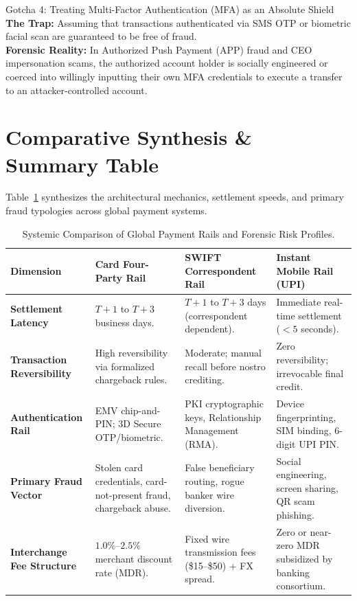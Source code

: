 \begin{trapbox}{Gotcha 4: Treating Multi-Factor Authentication (MFA) as an Absolute Shield}
\textbf{The Trap:} Assuming that transactions authenticated via SMS OTP or biometric facial scan are guaranteed to be free of fraud.\\
\textbf{Forensic Reality:} In Authorized Push Payment (APP) fraud and CEO impersonation scams, the authorized account holder is socially engineered or coerced into willingly inputting their own MFA credentials to execute a transfer to an attacker-controlled account.
\end{trapbox}

\section{Comparative Synthesis \& Summary Table}

Table~\ref{tab:comparison_payment_rails} synthesizes the architectural mechanics, settlement speeds, and primary fraud typologies across global payment systems.

\begin{table}[htbp]
\centering
\small
\begin{tabularx}{\textwidth}{lXXX}
\toprule
\textbf{Dimension} & \textbf{Card Four-Party Rail} & \textbf{SWIFT Correspondent Rail} & \textbf{Instant Mobile Rail (UPI)} \\
\midrule
\textbf{Settlement Latency} & $T + 1$ to $T + 3$ business days. & $T + 1$ to $T + 3$ days (correspondent dependent). & Immediate real-time settlement ($< 5$ seconds). \\
\addlinespace
\textbf{Transaction Reversibility} & High reversibility via formalized chargeback rules. & Moderate; manual recall before nostro crediting. & Zero reversibility; irrevocable final credit. \\
\addlinespace
\textbf{Authentication Rail} & EMV chip-and-PIN; 3D Secure OTP/biometric. & PKI cryptographic keys, Relationship Management (RMA). & Device fingerprinting, SIM binding, 6-digit UPI PIN. \\
\addlinespace
\textbf{Primary Fraud Vector} & Stolen card credentials, card-not-present fraud, chargeback abuse. & False beneficiary routing, rogue banker wire diversion. & Social engineering, screen sharing, QR scam phishing. \\
\addlinespace
\textbf{Interchange Fee Structure} & $1.0\%$--$2.5\%$ merchant discount rate (MDR). & Fixed wire transmission fees (\$15--\$50) + FX spread. & Zero or near-zero MDR subsidized by banking consortium. \\
\bottomrule
\end{tabularx}
\caption{Systemic Comparison of Global Payment Rails and Forensic Risk Profiles.}
\label{tab:comparison_payment_rails}
\end{table}

